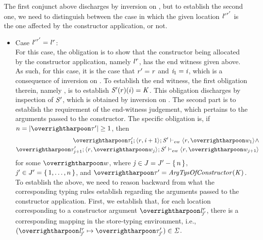 \begin{nproof}
\begin{bcase}
\begin{itemize}
\begin{itemize}
      The first conjunct above discharges
      by inversion on \ddatacon{}, but
      to establish the second one, we need to distinguish
      between the case in which the given location ${\mathit{l}'}^{\mathit{r}'}$ is the one
      affected by the constructor application, or not.
      \begin{itemize}
      \item Case ${\mathit{l}'}^{\mathit{r}'} = {\mathit{l}}^{\mathit{r}}$: \\
        For this case, the obligation is to show that the constructor being
        allocated by the constructor application, namely ${\mathit{l}}^{\mathit{r}}$,
        has the end witness given above.
        As such, for this case, it is the case that $\mathit{r}' = \mathit{r}$ and $\mathit{i}_1 = \mathit{i}$, which is
        a consequence of inversion on \ddatacon{}.
        To establish the end witness, the first obligation therein, namely ,
        is to establish $\mathit{S}'(r)(i) = \mathit{K}$.
        This obligation discharges by inspection of $\mathit{S}'$, which is obtained by inversion on \ddatacon{}.
        The second part is to establish the requirement
         of the end-witness
        judgement, which pertains to the arguments passed to the constructor.
        The specific obligation is, if $n = | \overharpoon{\TYP'} | \geq 1$, then
           \begin{align}
           \ewitness{\overharpoon{\TYP'_1}}{\concreteloc{\reg}{\ind + 1}{}}{\STOR'}{\concreteloc{\reg}{\overharpoon{w_1}}{}} \wedge \label{prf:ew-req1} \\
           \ewitness{\overharpoon{\TYP'_{j+1}}}{\concreteloc{\reg}{\overharpoon{w_j}}{}}{\STOR'}{\concreteloc{\reg}{\overharpoon{w_{j+1}}}{}} \label{prf:ew-req2}
           \end{align}
           for some $\overharpoon{w}$, where
           $\mathit{j} \in J = J' - \{ \, n \,\}$, $\mathit{j}' \in J' = \{ \, 1,\ldots,n \,\}$, and
           $\overharpoon{\TYP'} = \kargtys(\DC)$.
           To establish the above, we need
           to reason backward from what
           the corresponding typing rules establish regarding the
           arguments passed to the constructor application.
           First, we establish that, for each location corresponding to a constructor argument
           $\overharpoon{\locreg{\loc}{\reg}_{\indj'}}$,
           there is a corresponding mapping in the store-typing environment, i.e.,
           $(\overharpoon{\locreg{\loc}{\reg}_{\indj'}} \mapsto \overharpoon{\TYP_{\indj'}'}) \in \SENV$.

\end{itemize}
\end{itemize}
\end{itemize}
\end{bcase}
\end{nproof}

